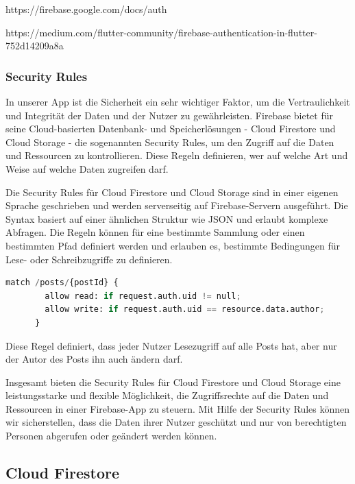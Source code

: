 https://firebase.google.com/docs/auth

https://medium.com/flutter-community/firebase-authentication-in-flutter-752d14209a8a

\subsubsection{Security Rules}\label{sec:security-rules}
In unserer App ist die Sicherheit ein sehr wichtiger Faktor,
um die Vertraulichkeit und Integrität der Daten und der
Nutzer zu gewährleisten. Firebase bietet für seine
Cloud-basierten Datenbank- und Speicherlösungen - Cloud
Firestore und Cloud Storage - die sogenannten Security
Rules\cite{firebase-rules-docs}\cite{firestore-rules-firestore-nochba}\cite{storage-rules-storage-nochba}, um den Zugriff auf
die Daten und Ressourcen zu kontrollieren. Diese Regeln
definieren, wer auf welche Art und Weise auf welche Daten
zugreifen darf.

Die Security Rules für Cloud Firestore und Cloud Storage sind in einer eigenen Sprache geschrieben und werden serverseitig auf Firebase-Servern ausgeführt. Die Syntax basiert auf einer ähnlichen Struktur wie JSON und erlaubt komplexe Abfragen. Die Regeln können für eine bestimmte Sammlung oder einen bestimmten Pfad definiert werden und erlauben es, bestimmte Bedingungen für Lese- oder Schreibzugriffe zu definieren.


\begin{lstlisting}[language=Python,caption=Security Rules Beispiel]
    match /posts/{postId} {
        allow read: if request.auth.uid != null;
        allow write: if request.auth.uid == resource.data.author;
      }
\end{lstlisting}

Diese Regel definiert, dass jeder Nutzer Lesezugriff auf
alle Posts hat, aber nur der Autor des Posts ihn auch ändern
darf.

Insgesamt bieten die Security Rules für Cloud Firestore und Cloud Storage eine leistungsstarke und flexible Möglichkeit, die Zugriffsrechte auf die Daten und Ressourcen in einer Firebase-App zu steuern. Mit Hilfe der Security Rules können wir sicherstellen, dass die Daten ihrer Nutzer geschützt und nur von berechtigten Personen abgerufen oder geändert werden können.



\subsection{Cloud Firestore}

